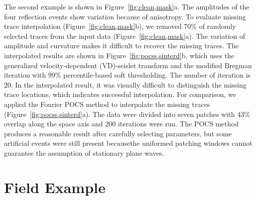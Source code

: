 
The second example is shown in Figure~\ref{fig:clean,mask}a. The
amplitudes of the four reflection events show variation because of
anisotropy. To evaluate missing trace interpolation
(Figure~\ref{fig:clean,mask}b), we removed 70\% of randomly selected
traces from the input data (Figure~\ref{fig:clean,mask}a). The
variation of amplitude and curvature makes it difficult to recover the
missing traces. The interpolated results are shown in
Figure~\ref{fig:pocss,sinterd}b, which uses the generalized
velocity-dependent (VD)-seislet transform and the modified Bregman
iteration with 99\% percentile-based soft thresholding. The number of
iteration is 20. In the interpolated result, it was visually difficult
to distinguish the missing trace locations, which indicates successful
interpolation. For comparison, we applied the Fourier POCS method to
interpolate the missing traces (Figure~\ref{fig:pocss,sinterd}a). The
data were divided into seven patches with 43\% overlap along the space
axis and 200 iterations were run. The POCS method produces a
reasonable result after carefully selecting parameters, but some
artificial events were still present becausethe uniformed patching
windows cannot guarantee the assumption of stationary plane waves.


 \section{Field Example}

